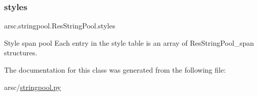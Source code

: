 \subsubsection{\texorpdfstring{styles}{styles}}
{\footnotesize\ttfamily arsc.\+stringpool.\+Res\+String\+Pool.\+styles}



Style span pool Each entry in the style table is an array of Res\+String\+Pool\+\_\+span structures. 



The documentation for this class was generated from the following file\+:\begin{DoxyCompactItemize}
\item 
arsc/\mbox{\hyperlink{stringpool_8py}{stringpool.\+py}}\end{DoxyCompactItemize}
